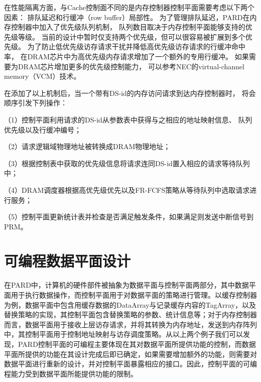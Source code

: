 
在性能隔离方面，与Cache控制面不同的是内存控制器控制平面需要考虑以下两个因素：
排队延迟和行缓冲（row buffer）局部性。
为了管理排队延迟，PARD在内存控制器中加入了优先级队列机制，
队列数目取决于内存控制平面能够支持的优先级等级。
当前的设计中暂时仅支持两个优先级，但可以很容易被扩展到多个优先级。
为了防止低优先级访存请求干扰并降低高优先级访存请求的行缓冲命中率，
在DRAM芯片中为高优先级内存请求增加了一个额外的专用行缓冲。
如果需要为DRAM芯片增加更多的优先级控制能力，
可以参考NEC的virtual-channel memory（VCM）技术。

在添加了以上机制后，当一个带有DS-id的内存访问请求到达内存控制器时，
将会顺序引发下列操作：

（1）控制平面利用请求的DS-id从参数表中获得与之相应的地址映射信息、
队列优先级以及行缓冲编号；

（2）请求逻辑域物理地址被转换成DRAM物理地址；

（3）根据控制表中获取的优先级信息将请求连同DS-id置入相应的请求等待队列中；

（4）DRAM调度器根据高优先级优先以及FR-FCFS\cite{rixner_memory_2000}策略从等待队列中选取请求进行服务；

（5）控制平面更新统计表并检查是否满足触发条件，如果满足则发送中断信号到PRM。


\section{可编程数据平面设计}

在PARD中，计算机的硬件部件被抽象为数据平面与控制平面两部分，其中数据平面用于执行数据操作，而控制平面用于对数据平面的策略进行管理。以缓存控制器为例，数据平面中包含用缓存数据的DataArray与记录缓存内容的TagArray，以及替换策略的实现，其控制平面包含替换策略的参数、统计信息等；对于内存控制器而言，数据平面用于接收上层访存请求，并将其转换为内存地址，发送到内存阵列中，其控制平面用于控制地址映射与访存调度策略。从以上两个例子我们可以发现，PARD控制平面的可编程主要体现在其对数据平面所提供功能的控制，而数据平面所提供的功能在其设计完成后即已确定，如果需要增加额外的功能，则需要对数据平面进行重新的设计，并对控制平面暴露相应的接口。因此，控制平面的可编程能力受到数据平面所能提供功能的限制。


